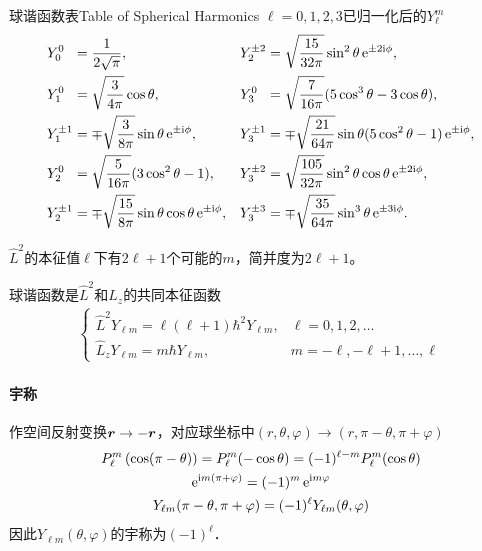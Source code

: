 \begin{example}{球谐函数表}{Table of Spherical Harmonics}
	$\ell=0,1,2,3$已归一化后的$Y_\ell^m$
	\begin{align*}
		Y_0^0~\;    & =\frac1{2\sqrt\pi},                                           & Y_2^{\pm 2} & =\sqrt{\frac{15}{32\pi}}\sin^2\theta\mathop{}\!\mathrm{e}^{\pm 2\mathrm{i}\phi},                 \\
		Y_1^0~\;    & =\sqrt{\frac3{4\pi}}\cos\theta,                               & Y_3^0~\;    & =\sqrt{\frac7{16\pi}}(5\cos^3\theta-3\cos\theta),                    \\
		Y_1^{\pm 1} & =\mp\sqrt{\frac3{8\pi}}\sin\theta\mathop{}\!\mathrm{e}^{\pm\mathrm{i}\phi},               & Y_3^{\pm 1} & =\mp\sqrt{\frac{21}{64\pi}}\sin\theta(5\cos^2\theta-1)\mathop{}\!\mathrm{e}^{\pm\mathrm{i}\phi}, \\
		Y_2^0~\;    & =\sqrt{\frac5{16\pi}}(3\cos^2\theta-1),                       & Y_3^{\pm 2} & =\sqrt{\frac{105}{32\pi}}\sin^2\theta\cos\theta\mathop{}\!\mathrm{e}^{\pm 2\mathrm{i}\phi},      \\
		Y_2^{\pm 1} & =\mp\sqrt{\frac{15}{8\pi}}\sin\theta\cos\theta\mathop{}\!\mathrm{e}^{\pm \mathrm{i}\phi}, & Y_3^{\pm 3} & =\mp\sqrt{\frac{35}{64\pi}}\sin^3\theta\mathop{}\!\mathrm{e}^{\pm 3\mathrm{i}\phi}.
	\end{align*}
\end{example}
$\hat L^2$的本征值$\ell$下有$2\ell+1$个可能的$m$，简并度为$2\ell+1$。

球谐函数是$\hat L^2$和$\hat L_z$的共同本征函数
\begin{align*}
	\begin{cases}
		\hat L^2Y_{\ell m}=\ell(\ell+1)\hbar^2Y_{\ell m}, & \ell=0,1,2,\ldots           \\
		\hat L_zY_{\ell m}=m\hbar Y_{\ell m},             & m=-\ell,-\ell+1,\ldots,\ell
	\end{cases}
\end{align*}
\paragraph{宇称}作空间反射变换$\bm r\to-\bm r$，对应球坐标中$(r,\theta,\varphi)\to(r,\pi-\theta,\pi+\varphi)$
\begin{gather*}
	P_{\ell}^{m}\left(\cos (\pi-\theta)\right)=P_{\ell}^{m}(-\cos \theta)=(-1)^{\ell-m} P_{\ell}^{m}(\cos \theta) \\
	\mathop{}\!\mathrm{e}^{\mathrm{i} m(\pi+\varphi)}=(-1)^{m}\mathop{}\!\mathrm{e}^{\mathrm{i} m \varphi}                                                   \\
	Y_{\ell m}(\pi-\theta, \pi+\varphi)=(-1)^{\ell} Y_{\ell m}(\theta, \varphi)
\end{gather*}
因此$Y_{\ell m}(\theta,\varphi)$的宇称为$(-1)^\ell$．
